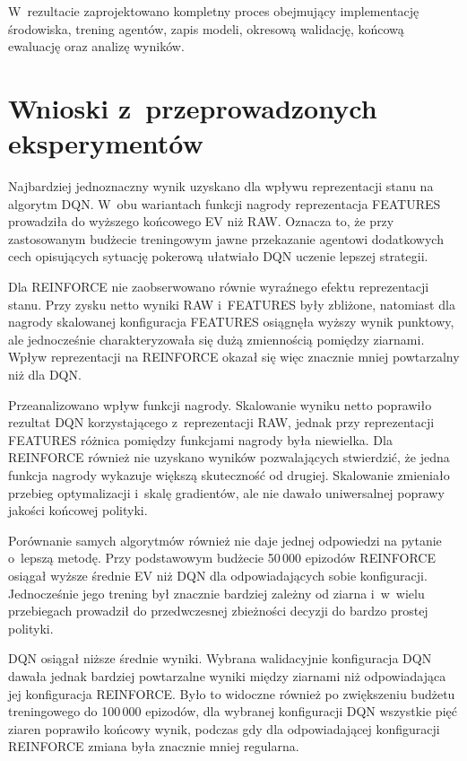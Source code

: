 W~rezultacie zaprojektowano kompletny proces obejmujący implementację
środowiska, trening agentów, zapis modeli, okresową walidację,
końcową ewaluację oraz analizę wyników.

\section*{Wnioski z~przeprowadzonych eksperymentów}
\label{sec:wnioski-eksperymenty}

Najbardziej jednoznaczny wynik uzyskano dla wpływu reprezentacji
stanu na algorytm DQN. W~obu wariantach funkcji nagrody reprezentacja FEATURES
prowadziła do wyższego końcowego EV niż RAW. Oznacza to, że przy
zastosowanym budżecie treningowym jawne przekazanie agentowi
dodatkowych cech opisujących sytuację pokerową ułatwiało DQN uczenie
lepszej strategii.

Dla REINFORCE nie zaobserwowano równie wyraźnego efektu reprezentacji
stanu. Przy zysku netto wyniki RAW i~FEATURES były zbliżone, natomiast
dla nagrody skalowanej konfiguracja FEATURES osiągnęła wyższy wynik
punktowy, ale jednocześnie charakteryzowała się dużą zmiennością
pomiędzy ziarnami. Wpływ reprezentacji na REINFORCE okazał się więc
znacznie mniej powtarzalny niż dla DQN.

Przeanalizowano wpływ funkcji nagrody. Skalowanie wyniku
netto poprawiło rezultat DQN korzystającego z~reprezentacji RAW,
jednak przy reprezentacji FEATURES różnica pomiędzy funkcjami nagrody
była niewielka. Dla REINFORCE również nie uzyskano wyników
pozwalających stwierdzić, że jedna funkcja nagrody wykazuje większą
skuteczność od drugiej. Skalowanie zmieniało przebieg optymalizacji i~skalę
gradientów, ale nie dawało uniwersalnej poprawy jakości końcowej
polityki.

Porównanie samych algorytmów również nie daje jednej odpowiedzi na
pytanie o~lepszą metodę. Przy podstawowym budżecie 50\,000 epizodów
REINFORCE osiągał wyższe średnie EV niż DQN dla odpowiadających sobie
konfiguracji. Jednocześnie jego trening był znacznie bardziej zależny
od ziarna i~w~wielu przebiegach prowadził do przedwczesnej zbieżności
decyzji do bardzo prostej polityki.

DQN osiągał niższe średnie wyniki. Wybrana walidacyjnie konfiguracja
DQN dawała jednak bardziej powtarzalne wyniki między ziarnami niż
odpowiadająca jej konfiguracja REINFORCE. Było to widoczne również po
zwiększeniu budżetu treningowego do 100\,000 epizodów, dla wybranej
konfiguracji DQN wszystkie pięć ziaren poprawiło końcowy wynik, podczas
gdy dla odpowiadającej konfiguracji REINFORCE zmiana była znacznie
mniej regularna.

